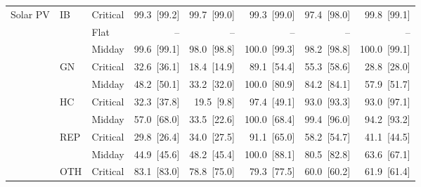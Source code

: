 \begin{tabular}{l l l r r r r r}
\addlinespace
Solar PV & IB & Critical & 99.3~{\color{seasoncol}\scriptsize[99.2]} & 99.7~{\color{seasoncol}\scriptsize[99.0]} & 99.3~{\color{seasoncol}\scriptsize[99.0]} & 97.4~{\color{seasoncol}\scriptsize[98.0]} & 99.8~{\color{seasoncol}\scriptsize[99.1]} \\
 &  & Flat & -- & -- & -- & -- & -- \\
 &  & Midday & 99.6~{\color{seasoncol}\scriptsize[99.1]} & 98.0~{\color{seasoncol}\scriptsize[98.8]} & 100.0~{\color{seasoncol}\scriptsize[99.3]} & 98.2~{\color{seasoncol}\scriptsize[98.8]} & 100.0~{\color{seasoncol}\scriptsize[99.1]} \\
 & GN & Critical & 32.6~{\color{seasoncol}\scriptsize[36.1]} & 18.4~{\color{seasoncol}\scriptsize[14.9]} & 89.1~{\color{seasoncol}\scriptsize[54.4]} & 55.3~{\color{seasoncol}\scriptsize[58.6]} & 28.8~{\color{seasoncol}\scriptsize[28.0]} \\
 &  & Midday & 48.2~{\color{seasoncol}\scriptsize[50.1]} & 33.2~{\color{seasoncol}\scriptsize[32.0]} & 100.0~{\color{seasoncol}\scriptsize[80.9]} & 84.2~{\color{seasoncol}\scriptsize[84.1]} & 57.9~{\color{seasoncol}\scriptsize[51.7]} \\
 & HC & Critical & 32.3~{\color{seasoncol}\scriptsize[37.8]} & 19.5~{\color{seasoncol}\scriptsize[9.8]} & 97.4~{\color{seasoncol}\scriptsize[49.1]} & 93.0~{\color{seasoncol}\scriptsize[93.3]} & 93.0~{\color{seasoncol}\scriptsize[97.1]} \\
 &  & Midday & 57.0~{\color{seasoncol}\scriptsize[68.0]} & 33.5~{\color{seasoncol}\scriptsize[22.6]} & 100.0~{\color{seasoncol}\scriptsize[68.4]} & 99.4~{\color{seasoncol}\scriptsize[96.0]} & 94.2~{\color{seasoncol}\scriptsize[93.2]} \\
 & REP & Critical & 29.8~{\color{seasoncol}\scriptsize[26.4]} & 34.0~{\color{seasoncol}\scriptsize[27.5]} & 91.1~{\color{seasoncol}\scriptsize[65.0]} & 58.2~{\color{seasoncol}\scriptsize[54.7]} & 41.1~{\color{seasoncol}\scriptsize[44.5]} \\
 &  & Midday & 44.9~{\color{seasoncol}\scriptsize[45.6]} & 48.2~{\color{seasoncol}\scriptsize[45.4]} & 100.0~{\color{seasoncol}\scriptsize[88.1]} & 80.5~{\color{seasoncol}\scriptsize[82.8]} & 63.6~{\color{seasoncol}\scriptsize[67.1]} \\
 & OTH & Critical & 83.1~{\color{seasoncol}\scriptsize[83.0]} & 78.8~{\color{seasoncol}\scriptsize[75.0]} & 79.3~{\color{seasoncol}\scriptsize[77.5]} & 60.0~{\color{seasoncol}\scriptsize[60.2]} & 61.9~{\color{seasoncol}\scriptsize[61.4]} \\

\end{tabular}
